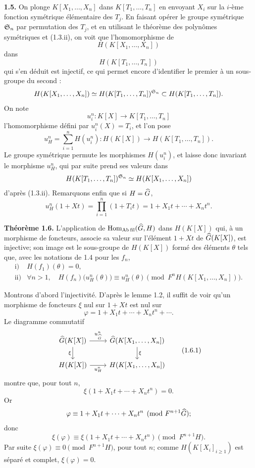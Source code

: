 \documentclass[11pt]{article}
\begin{document}
\textbf{1.5.} On plonge \(K[X_1,\ldots,X_n]\) dans \(K[T_1,\ldots,T_n]\) en envoyant \(X_i\) sur la \(i\)-ème fonction symétrique élémentaire des \(T_j\). En faisant opérer le groupe symétrique \(\mathfrak S_n\) par permutation des \(T_j\), et en utilisant le théorème des polynômes symétriques et (1.3.ii), on voit que l'homomorphisme de
\[
  H(K[X_1,\ldots,X_n])
\]
dans
\[
  H(K[T_1,\ldots,T_n])
\]
qui s'en déduit est injectif, ce qui permet encore d'identifier le premier à un sous-groupe du second :
\[
  H(K[X_1,\ldots,X_n])\simeq H(K[T_1,\ldots,T_n])^{\mathfrak S_n}
  \subset H(K[T_1,\ldots,T_n]).
\]
On note
\[
  u_i^n:K[X]\longrightarrow K[T_1,\ldots,T_n]
\]
l'homomorphisme défini par \(u_i^n(X)=T_i\), et l'on pose
\[
  u_H^n=\sum_{i=1}^n H(u_i^n):H(K[X])\longrightarrow H(K[T_1,\ldots,T_n]).
\]
Le groupe symétrique permute les morphismes \(H(u_i^n)\), et laisse donc invariant le morphisme \(u_H^n\), qui par suite prend ses valeurs dans
\[
  H(K[T_1,\ldots,T_n])^{\mathfrak S_n}
  \simeq H(K[X_1,\ldots,X_n])
\]
d'après (1.3.ii). Remarquons enfin que si \(H=\widehat G\),
\[
  u_H^n(1+Xt)=\prod_{i=1}^n(1+T_it)=1+X_1t+\cdots+X_nt^n.
\]

\textbf{Théorème 1.6.} L'application de \(\operatorname{Hom}_{\mathrm{Ab\,fil}}(\widehat G,H)\) dans \(H(K[X])\) qui, à un morphisme de foncteurs, associe sa valeur sur l'élément \(1+Xt\) de \(\widehat G(K[X])\), est injective; son image est le sous-groupe de \(H(K[X])\) formé des éléments \(\theta\) tels que, avec les notations de 1.4 pour les \(f_n\),
\[
\begin{array}{ll}
\text{i)}& H(f_1)(\theta)=0,\\[0.3em]
\text{ii)}& \forall n>1,\quad
H(f_n)\bigl(u_H^n(\theta)\bigr)\equiv u_H^n(\theta)
\pmod{F^nH(K[X_1,\ldots,X_n])}.
\end{array}
\]

Montrons d'abord l'injectivité. D'après le lemme 1.2, il suffit de voir qu'un morphisme de foncteurs \(\xi\) nul sur \(1+Xt\) est nul sur
\[
  \varphi=1+X_1t+\cdots+X_nt^n+\cdots .
\]
Le diagramme commutatif
\[
\begin{tikzcd}
\Ghat(K[X]) \arrow[r,"u^n_{\Ghat}"] \arrow[d,"\xi"'] &
\Ghat(K[X_1,\ldots,X_n]) \arrow[d,"\xi"]\\
H(K[X]) \arrow[r,"u_H^n"'] &
H(K[X_1,\ldots,X_n])
\end{tikzcd}
\tag{1.6.1}
\]
montre que, pour tout \(n\),
\[
  \xi(1+X_1t+\cdots+X_nt^n)=0.
\]
Or
\[
  \varphi\equiv 1+X_1t+\cdots+X_nt^n
  \pmod{F^{n+1}\widehat G};
\]
donc
\[
  \xi(\varphi)\equiv \xi(1+X_1t+\cdots+X_nt^n)
  \pmod{F^{n+1}H}.
\]
Par suite \(\xi(\varphi)\equiv0\pmod{F^{n+1}H}\), pour tout \(n\); comme \(H(K[X_i]_{i\geq 1})\) est séparé et complet, \(\xi(\varphi)=0\).
\end{document}
